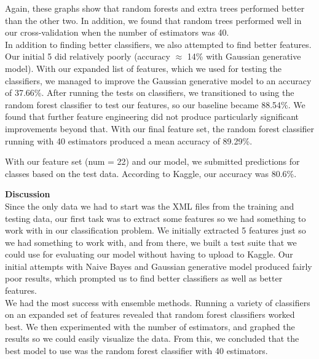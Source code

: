 \documentclass[12pt]{article}
\begin{document}
Again, these graphs show that random forests and extra trees performed better than the other two. In addition, we found that random trees performed well in our cross-validation when the number of estimators was 40. \\

In addition to finding better classifiers, we also attempted to find better features. Our initial 5 did relatively poorly (accuracy $\approx$ 14\% with Gaussian generative model). With our expanded list of features, which we used for testing the classifiers, we managed to improve the Gaussian generative model to an accuracy of 37.66\%. After running the tests on classifiers, we transitioned to using the random forest classifier to test our features, so our baseline became 88.54\%. We found that further feature engineering did not produce particularly significant improvements beyond that. With our final feature set, the random forest classifier running with 40 estimators produced a mean accuracy of 89.29\%. 

With our feature set (num = 22) and our model, we submitted predictions for classes based on the test data. According to Kaggle, our accuracy was 80.6\%.

\bigskip

\textbf{Discussion} \\
Since the only data we had to start was the XML files from the training and testing data, our first task was to extract some features so we had something to work with in our classification problem. We initially extracted 5 features just so we had something to work with, and from there, we built a test suite that we could use for evaluating our model without having to upload to Kaggle. Our initial attempts with Naive Bayes and Gaussian generative model produced fairly poor results, which prompted us to find better classifiers as well as better features. \\

We had the most success with ensemble methods. Running a variety of classifiers on an expanded set of features revealed that random forest classifiers worked best. We then experimented with the number of estimators, and graphed the results so we could easily visualize the data. From this, we concluded that the best model to use was the random forest classifier with 40 estimators.  \\
\end{document}
